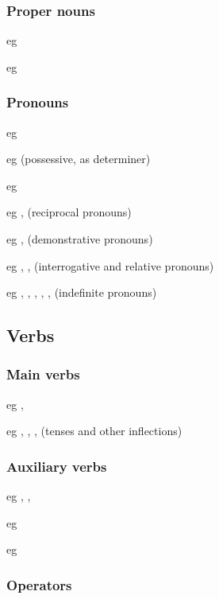 \subsubsection{Proper nouns}

eg 

eg 

\subsubsection{Pronouns}

eg 

eg  (possessive, as determiner)

eg 

eg ,  (reciprocal pronouns)

eg ,  (demonstrative pronouns)

eg , ,  (interrogative and relative pronouns)

eg , , , , ,  (indefinite pronouns)

\subsection{Verbs}

\subsubsection{Main verbs}

eg , 

eg , , ,  (tenses and other inflections)

\subsubsection{Auxiliary verbs}

eg , , 

eg 

eg 

\subsubsection{Operators}

